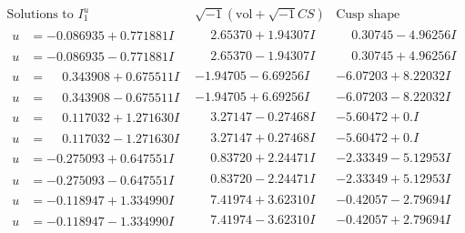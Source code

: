 \documentclass[1p]{elsarticle_modified}
\theoremstyle{definition}
\newcommand{\I}{\sqrt{-1}}
\begin{document}
$$\begin{array}{c|c|c}  
\text{Solutions to }I^u_{1}& \I (\text{vol} + \sqrt{-1}CS) & \text{Cusp shape}\\
 \hline 
\begin{aligned}
u &= -0.086935 + 0.771881 I\end{aligned}
 & \phantom{-}2.65370 + 1.94307 I & \phantom{-}0.30745 - 4.96256 I \\ \hline\begin{aligned}
u &= -0.086935 - 0.771881 I\end{aligned}
 & \phantom{-}2.65370 - 1.94307 I & \phantom{-}0.30745 + 4.96256 I \\ \hline\begin{aligned}
u &= \phantom{-}0.343908 + 0.675511 I\end{aligned}
 & -1.94705 - 6.69256 I & -6.07203 + 8.22032 I \\ \hline\begin{aligned}
u &= \phantom{-}0.343908 - 0.675511 I\end{aligned}
 & -1.94705 + 6.69256 I & -6.07203 - 8.22032 I \\ \hline\begin{aligned}
u &= \phantom{-}0.117032 + 1.271630 I\end{aligned}
 & \phantom{-}3.27147 - 0.27468 I & -5.60472 + 0. I\phantom{ +0.000000I} \\ \hline\begin{aligned}
u &= \phantom{-}0.117032 - 1.271630 I\end{aligned}
 & \phantom{-}3.27147 + 0.27468 I & -5.60472 + 0. I\phantom{ +0.000000I} \\ \hline\begin{aligned}
u &= -0.275093 + 0.647551 I\end{aligned}
 & \phantom{-}0.83720 + 2.24471 I & -2.33349 - 5.12953 I \\ \hline\begin{aligned}
u &= -0.275093 - 0.647551 I\end{aligned}
 & \phantom{-}0.83720 - 2.24471 I & -2.33349 + 5.12953 I \\ \hline\begin{aligned}
u &= -0.118947 + 1.334990 I\end{aligned}
 & \phantom{-}7.41974 + 3.62310 I & -0.42057 - 2.79694 I \\ \hline\begin{aligned}
u &= -0.118947 - 1.334990 I\end{aligned}
 & \phantom{-}7.41974 - 3.62310 I & -0.42057 + 2.79694 I \\ \hline\begin{aligned}

\end{aligned}
\end{array}$$
\end{document}
